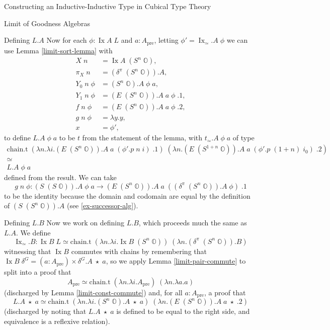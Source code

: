 \documentclass[runningheads]{llncs}
\DeclareMathOperator{\Ix}{Ix}
\newcommand{\pre}[1]{{#1}_\text{pre}}
\newcommand{\bbO}{\mathbb{O}}
\begin{document}
\begin{section}{Constructing an Inductive-Inductive Type in Cubical Type Theory}
\begin{subsection}{Limit of Goodness Algebras}
{\begin{subsubsection}{Defining $L.A$}
Now for each $\phi : \Ix A\;L$ and $a : \pre{A}$, letting $\phi' = \Ix_\simeq.A\;\phi$ we can use Lemma \ref{limit-sort-lemma} with \begin{align*}
X\;n &= \Ix A\;(S^n\;\bbO),\\
\pi_X\;n &= (\delta^\pi\;(S^n\;\bbO)).A,\\
Y_0\;n\;\phi &= (S^n\;\bbO).A\;\phi\;a,\\
Y_1\;n\;\phi &= (E\;(S^n\;\bbO)).A\;a\;\phi\;.1,\\
f\;n\;\phi &= (E\;(S^n\;\bbO)).A\;a\;\phi\;.2,\\
g\;n\;\phi &= \lambda y.y,\\
x &= \phi',
\end{align*}
to define $L.A\;\phi\;a$ to be $t$ from the statement of the lemma, with $t_\simeq.A\;\phi\;a$ of type \begin{gather*}
\text{chain.t}\;(\lambda n.\lambda i.(E\;(S^n\;\bbO)).A\;a\;(\phi'.p\;n\;i)\;.1)\;(\lambda n.(E\;(S^{1+n}\;\bbO)).A\;a\;(\phi'.p\;(1+n)\;i_0)\;.2)\\\simeq\\L.A\;\phi\;a
\end{gather*} defined from the result. We can take \[g\;n\;\phi : (S\;(S\;\bbO)).A\;\phi\;a \to (E\;(S^n\;\bbO)).A\;a\;((\delta^\pi\;(S^n\;\bbO)).A\;\phi)\;.1\] to be the identity because the domain and codomain are equal by the definition of $(S\;(S^n\;\bbO)).A$ (see \ref{ex-successor-alg}).
\end{subsubsection}

\begin{subsubsection}{Defining $L.B$}
Now we work on defining $L.B$, which proceeds much the same as $L.A$.
We define \[\Ix_\simeq.B : \Ix B\;L \simeq \text{chain.t}\;(\lambda n.\lambda i.\Ix B\;(S^n\;\bbO))\;(\lambda n.(\delta^\pi\;(S^n\;\bbO)).B)\] witnessing that $\Ix B$ commutes with chains by remembering that $\Ix B\;\delta^G = (a : \pre{A}) \times \delta^G.A\;\star\;a$, so we apply Lemma \ref{limit-pair-commute} to split into a proof that \[\pre{A} \simeq \text{chain.t}\;(\lambda n.\lambda i. \pre{A})\;(\lambda n.\lambda a.a)\] (discharged by Lemma \ref{limit-const-commute}) and, for all $a : \pre{A}$, a proof that \[L.A\;\star\;a \simeq \text{chain.t}\;(\lambda n.\lambda i.(S^n\;\bbO).A\;\star\;a)\;(\lambda n.(E\;(S^n\;\bbO)).A\;a\;\star\;.2)\] (discharged by noting that $L.A\;\star\;a$ is defined to be equal to the right side, and equivalence is a reflexive relation).


\end{subsubsection}}
\end{subsection}
\end{section}
\end{document}
